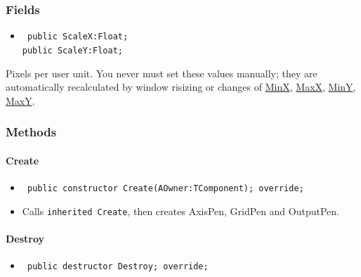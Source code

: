 \documentclass[12pt,a4paper,oneside]{report}
\newcommand{\declarationitem}[1]{{\addfontfeatures{FakeSlant} #1}}
\newcommand{\descriptiontitle}[1]{{\addfontfeatures{FakeSlant}#1}}
\newcommand{\inlineitem}[1]{{\addfontfeatures{FakeBold} #1}}
\newcommand{\code}[1]{\texttt{#1}}
\begin{document}
\subsubsection{Fields}
\begin{itemize}\label{lmcoordsys.TCoordSys-ScaleX}
\item[\inlineitem{ScaleX, ScaleY}\hfill]
\begin{flushleft}
\code{
public ScaleX:Float;\\
public ScaleY:Float;}
\end{flushleft}
\end{itemize}
\par Pixels per user unit. You never must set these values manually; they are automatically recalculated by window risizing or changes of \hyperref[lmcoordsys.TCoordSys-MinX]{MinX}, \hyperref[lmcoordsys.TCoordSys-MinX]{MaxX}, \hyperref[lmcoordsys.TCoordSys-MinY]{MinY}, \hyperref[lmcoordsys.TCoordSys-MinY]{MaxY}. \label{lmcoordsys.TCoordSys-ScaleY}

\subsubsection{Methods}
\paragraph{Create}\hspace*{\fill}
\label{lmcoordsys.TCoordSys-Create}
\begin{itemize}\item[\declarationitem{Declaration}\hfill]
\begin{flushleft}
\code{
public constructor Create(AOwner:TComponent); override;}
\end{flushleft}
\item[\descriptiontitle{Description}] Calls \code{inherited Create}, then creates AxisPen, GridPen and OutputPen. 
\end{itemize}
\paragraph{Destroy}\hspace*{\fill}
\label{lmcoordsys.TCoordSys-Destroy}
\begin{itemize}\item[\declarationitem{Declaration}\hfill]
\begin{flushleft}
\code{
public destructor Destroy; override;}
\end{flushleft}
\end{itemize}
\end{document}
